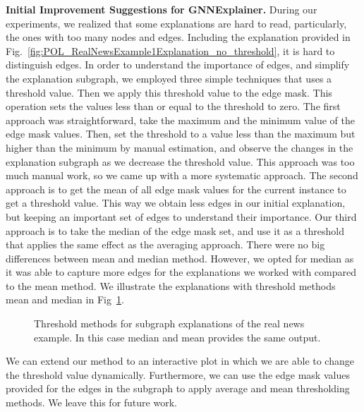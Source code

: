 \textbf{Initial Improvement Suggestions for GNNExplainer.} During our experiments, we realized that some explanations are hard to read, particularly, the ones with too many nodes and edges. Including the explanation provided in Fig.~\ref{fig:POL_RealNewsExample1Explanation_no_threshold}, it is hard to distinguish edges. In order to understand the importance of edges, and simplify the explanation subgraph, we employed three simple techniques that uses a threshold value. Then we apply this threshold value to the edge mask. This operation  sets the values less than or equal to the threshold to zero. The first approach was straightforward, take the maximum and the minimum value of the edge mask values. Then, set the threshold to a value less than the maximum but higher than the minimum by manual estimation, and observe the changes in the explanation subgraph as we decrease the threshold value. This approach was too much manual work, so we came up with a more systematic approach. The second approach is to get the mean of all edge mask values for the current instance to get a threshold value. This way we obtain less edges in our initial explanation, but keeping an important set of edges to understand their importance. Our third approach is to take the median of the edge mask set, and use it as a threshold that applies the same effect as the averaging approach. There were no big differences between mean and median method. However, we opted for median as it was able to capture more edges for the explanations we worked with compared to the mean method. We illustrate the explanations with threshold methods mean and median in Fig~\ref{fig:POL_RealNewsExample1Explanation_with_threshold}.\\
\begin{figure}
    \centering
    \hfill
    \caption[Threshold methods for subgraph explanations of the real news example.]{Threshold methods for subgraph explanations of the real news example. In this case median and mean provides the same output.}
    \label{fig:POL_RealNewsExample1Explanation_with_threshold}
\end{figure}
We can extend our method to an interactive plot in which we are able to change the threshold value dynamically. Furthermore, we can use the edge mask values provided for the edges in the subgraph to apply average and mean thresholding methods. We leave this for future work.\\
